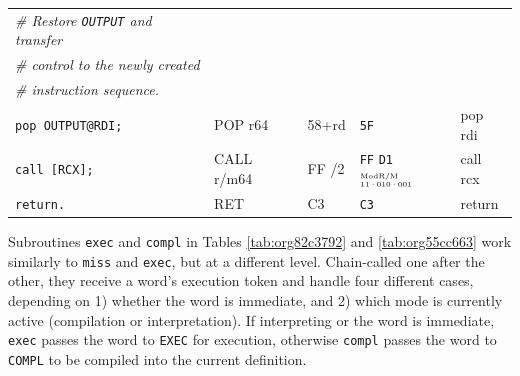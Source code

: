 \documentclass[a4paper,12pt,final]{article}
\begin{document}
\begin{table}[!htbp]
\begin{adjustwidth}{-1cm}{-1cm}
\begin{center}
\begin{tabular}{l|ll|lH}
\emph{\# Restore \texttt{OUTPUT} and transfer} &  &  &  & \\[0pt]
\emph{\# control to the newly created} &  &  &  & \\[0pt]
\emph{\# instruction sequence.} &  &  &  & \\[0pt]
\texttt{pop OUTPUT@RDI;} & POP r64 & 58+rd & \texttt{5F} & pop rdi\\[0pt]
\texttt{call [RCX];} & CALL r/m64 & FF /2 & \texttt{FF} \texttt{D1}​\(^{\text{\tiny ModR/M}}_{\text{\tiny 11·010·001}}\) & call rcx\\[0pt]
\texttt{return.} & RET & C3 & \texttt{C3} & return\\[0pt]
\end{tabular}

\end{center}
\normalsize \end{adjustwidth} \end{table} \vspace{0}

Subroutines \texttt{exec} and \texttt{compl} in Tables \ref{tab:org82c3792} and
\ref{tab:org55cc663} work similarly to \texttt{miss} and \texttt{exec}, but at a
different level.  Chain-called one after the other, they receive a
word's execution token and handle four different cases, depending
on 1) whether the word is immediate, and 2) which mode is currently
active (compilation or interpretation).  If interpreting or the word
is immediate, \texttt{exec} passes the word to \texttt{EXEC} for execution,
otherwise \texttt{compl} passes the word to \texttt{COMPL} to be compiled into the
current definition.
\end{document}

